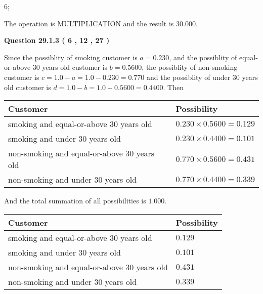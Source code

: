 \documentclass[12pt]{article}
\begin{document}
6;
 
The operation is  %
MULTIPLICATION and the result is
$ %
30.000$.
 
 
 
  
\vspace{0.2in}
  
{\textbf{\Large{Question
29.1.3 
 (           6 ,          12 ,          27 )
}}}
  
  
 
 
\noindent{}

Since the possiblity of  %
smoking customer is $ a =  %
0.230 $,
and the possiblity of  %
equal-or-above 30 years old customer is $ b =  %
0.5600 $,
the possiblity of  %
non-smoking customer is $ c = 1.0 - a = 1.0 -
0.230
=  %
0.770 $ and the possiblity of  %
under 30 years old
customer is $ d = 1.0 - b = 1.0 -  %
0.5600 =  %
0.4400  $.
Then
 
\noindent
\begin{tabular}{|l|l|}
\hline
Customer & Possibility \\
\hline
smoking  and  %
equal-or-above 30 years old  &
  $ %
0.230 \times  %
0.5600 =  %
0.129$ \\
\hline
smoking  and  %
under 30 years old &
  $ %
0.230 \times  %
0.4400 =  %
0.101$ \\
\hline
 non-smoking and  %
equal-or-above 30 years old  &
  $ %
0.770 \times  %
0.5600 =  %
0.431$ \\
\hline
 non-smoking and  %
under 30 years old &
  $ %
0.770 \times  %
0.4400 =  %
0.339$ \\
\hline
\end{tabular}
 
\noindent
And the total summation of all possibilities is $  %
1.000 $.
 
 
 
 
 
 
\noindent{}

 
\noindent
\begin{tabular}{|l|l|}
\hline
Customer & Possibility \\
\hline
smoking  and  %
equal-or-above 30 years old &
  $ %
0.129$ \\
\hline
smoking  and  %
under 30 years old &
  $ %
0.101$ \\
\hline
 non-smoking and  %
equal-or-above 30 years old &
  $ %
0.431$ \\
\hline
 non-smoking and  %
under 30 years old &
  $ %
0.339$ \\
\hline
\end{tabular}
 
\end{document}

